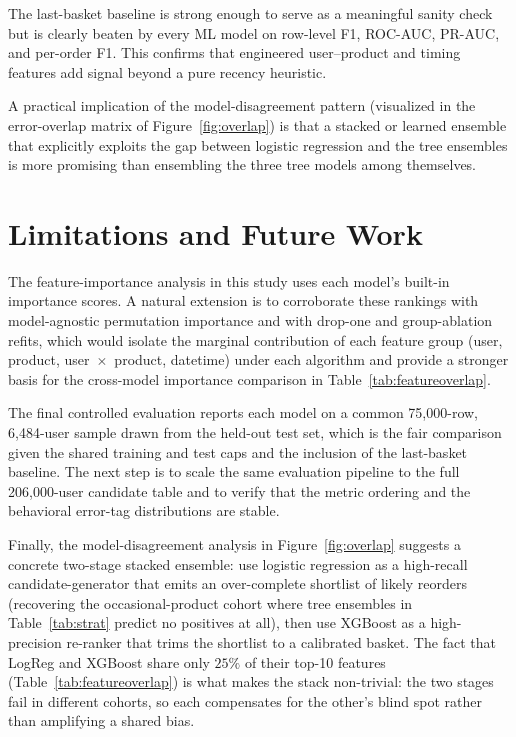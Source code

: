 \documentclass[10pt,twocolumn]{article}
\begin{document}
The last-basket baseline is strong enough to serve as a meaningful sanity check but is clearly beaten by every ML model on row-level F1, ROC-AUC, PR-AUC, and per-order F1. This confirms that engineered user--product and timing features add signal beyond a pure recency heuristic.

A practical implication of the model-disagreement pattern (visualized in the error-overlap matrix of Figure~\ref{fig:overlap}) is that a stacked or learned ensemble that explicitly exploits the gap between logistic regression and the tree ensembles is more promising than ensembling the three tree models among themselves.

\section{Limitations and Future Work}

The feature-importance analysis in this study uses each model's built-in importance scores. A natural extension is to corroborate these rankings with model-agnostic permutation importance and with drop-one and group-ablation refits, which would isolate the marginal contribution of each feature group (user, product, user~$\times$~product, datetime) under each algorithm and provide a stronger basis for the cross-model importance comparison in Table~\ref{tab:featureoverlap}.

The final controlled evaluation reports each model on a common 75{,}000-row, 6{,}484-user sample drawn from the held-out test set, which is the fair comparison given the shared training and test caps and the inclusion of the last-basket baseline. The next step is to scale the same evaluation pipeline to the full 206{,}000-user candidate table and to verify that the metric ordering and the behavioral error-tag distributions are stable.

Finally, the model-disagreement analysis in Figure~\ref{fig:overlap} suggests a concrete two-stage stacked ensemble: use logistic regression as a high-recall candidate-generator that emits an over-complete shortlist of likely reorders (recovering the occasional-product cohort where tree ensembles in Table~\ref{tab:strat} predict no positives at all), then use XGBoost as a high-precision re-ranker that trims the shortlist to a calibrated basket. The fact that LogReg and XGBoost share only $25\%$ of their top-10 features (Table~\ref{tab:featureoverlap}) is what makes the stack non-trivial: the two stages fail in different cohorts, so each compensates for the other's blind spot rather than amplifying a shared bias.
\end{document}
